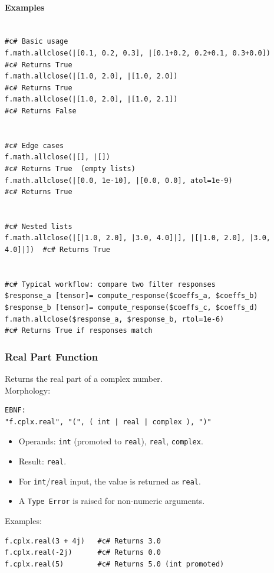 \paragraph{Examples}
\begin{verbatim}
                                                                         #c# Basic usage
f.math.allclose(|[0.1, 0.2, 0.3], |[0.1+0.2, 0.2+0.1, 0.3+0.0])          #c# Returns True
f.math.allclose(|[1.0, 2.0], |[1.0, 2.0])                                #c# Returns True
f.math.allclose(|[1.0, 2.0], |[1.0, 2.1])                                #c# Returns False

                                                                         #c# Edge cases
f.math.allclose(|[], |[])                                                #c# Returns True  (empty lists)
f.math.allclose(|[0.0, 1e-10], |[0.0, 0.0], atol=1e-9)                   #c# Returns True

                                                                         #c# Nested lists
f.math.allclose(|[|1.0, 2.0], |3.0, 4.0]|], |[|1.0, 2.0], |3.0, 4.0]|])  #c# Returns True

                                                                         #c# Typical workflow: compare two filter responses
$response_a [tensor]= compute_response($coeffs_a, $coeffs_b)
$response_b [tensor]= compute_response($coeffs_c, $coeffs_d)
f.math.allclose($response_a, $response_b, rtol=1e-6)                     #c# Returns True if responses match
\end{verbatim}

\label{sec:complex_functions}

\subsubsection{Real Part Function}
Returns the real part of a complex number. \\
Morphology:
\begin{verbatim}
EBNF:
"f.cplx.real", "(", ( int | real | complex ), ")"
\end{verbatim}
\begin{itemize}
\item Operands: \texttt{int} (promoted to \texttt{real}), \texttt{real}, \texttt{complex}.
\item Result: \texttt{real}.
\item For \texttt{int}/\texttt{real} input, the value is returned as \texttt{real}.
\item A \texttt{Type Error} is raised for non-numeric arguments.
\end{itemize}
Examples:
\begin{verbatim}
f.cplx.real(3 + 4j)   #c# Returns 3.0
f.cplx.real(-2j)      #c# Returns 0.0
f.cplx.real(5)        #c# Returns 5.0 (int promoted)
\end{verbatim}

